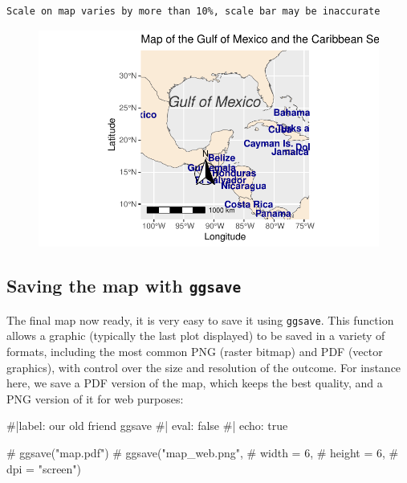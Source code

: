 \documentclass[
  letterpaper,
  DIV=11,
  numbers=noendperiod]{scrartcl}
\newenvironment{Shaded}{\begin{snugshade}}{\end{snugshade}}
\newcommand{\CommentTok}[1]{\textcolor[rgb]{0.37,0.37,0.37}{#1}}
\begin{document}
\begin{verbatim}
Scale on map varies by more than 10%, scale bar may be inaccurate
\end{verbatim}

\begin{figure}[H]

{\centering \includegraphics{Introduction-to-mapping_files/figure-pdf/unnamed-chunk-15-1.pdf}

}

\end{figure}

\hypertarget{saving-the-map-with-ggsave}{%
\subsection{\texorpdfstring{Saving the map with
\texttt{ggsave}}{Saving the map with ggsave}}\label{saving-the-map-with-ggsave}}

The final map now ready, it is very easy to save it using
\texttt{ggsave}. This function allows a graphic (typically the last plot
displayed) to be saved in a variety of formats, including the most
common PNG (raster bitmap) and PDF (vector graphics), with control over
the size and resolution of the outcome. For instance here, we save a PDF
version of the map, which keeps the best quality, and a PNG version of
it for web purposes:

\begin{Shaded}
\begin{Highlighting}[]
\CommentTok{\#|label: our old friend ggsave}
\CommentTok{\#| eval: false}
\CommentTok{\#| echo: true }

\CommentTok{\# ggsave("map.pdf")}
\CommentTok{\# ggsave("map\_web.png",}
\CommentTok{\#        width = 6,}
\CommentTok{\#        height = 6,}
\CommentTok{\#        dpi = "screen")}
\end{Highlighting}
\end{Shaded}
\end{document}
